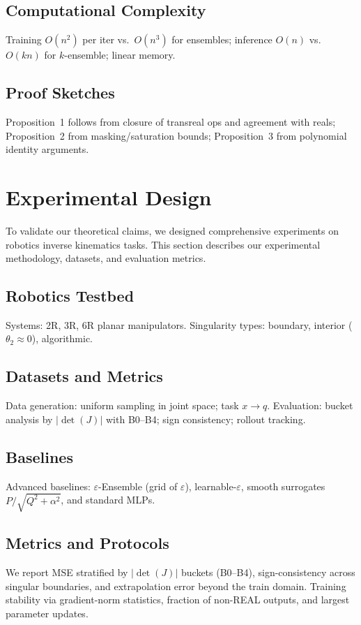 \documentclass[twoside,11pt]{article}
\newcommand{\trReal}{\textsc{REAL}}
\begin{document}
\subsection{Computational Complexity}
Training $O(n^2)$ per iter vs.\ $O(n^3)$ for ensembles; inference $O(n)$ vs.\ $O(kn)$ for $k$-ensemble; linear memory.
\subsection{Proof Sketches}
Proposition~1 follows from closure of transreal ops and agreement with reals; Proposition~2 from masking/saturation bounds; Proposition~3 from polynomial identity arguments.

\section{Experimental Design}
\label{sec:experimental_design}
To validate our theoretical claims, we designed comprehensive experiments on robotics inverse kinematics tasks. This section describes our experimental methodology, datasets, and evaluation metrics.

\subsection{Robotics Testbed}
Systems: 2R, 3R, 6R planar manipulators. Singularity types: boundary, interior ($\theta_2\approx 0$), algorithmic.
\subsection{Datasets and Metrics}
Data generation: uniform sampling in joint space; task $x\to q$.
Evaluation: bucket analysis by $|\det(J)|$ with B0--B4; sign consistency; rollout tracking.
\subsection{Baselines}
Advanced baselines: $\varepsilon$-Ensemble (grid of $\varepsilon$), learnable-$\varepsilon$, smooth surrogates $P/\sqrt{Q^2+\alpha^2}$, and standard MLPs.
\subsection{Metrics and Protocols}
We report MSE stratified by $|\det(J)|$ buckets (B0--B4), sign-consistency across singular boundaries, and extrapolation error beyond the train domain. Training stability via gradient-norm statistics, fraction of non-\trReal{} outputs, and largest parameter updates.
\end{document}
